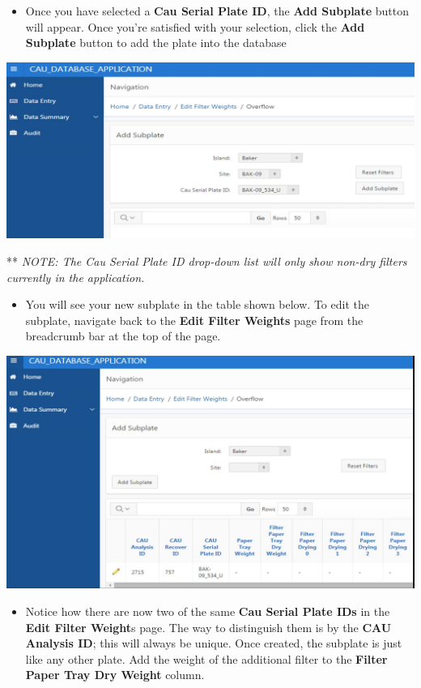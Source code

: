 \documentclass[
]{book}
\providecommand{\tightlist}{%
  \setlength{\itemsep}{0pt}\setlength{\parskip}{0pt}}
\begin{document}
\begin{itemize}
\tightlist
\item
  Once you have selected a \textbf{Cau Serial Plate ID}, the \textbf{Add Subplate} button will appear. Once you're satisfied with your selection, click the \textbf{Add Subplate} button to add the plate into the database
\end{itemize}

\includegraphics{images/Data19.jpg}

** \emph{NOTE: The Cau Serial Plate ID drop-down list will only show non-dry filters currently in the application.}

\begin{itemize}
\tightlist
\item
  You will see your new subplate in the table shown below. To edit the subplate, navigate back to the \textbf{Edit Filter Weights} page from the breadcrumb bar at the top of the page.
\end{itemize}

\includegraphics{images/Data20.jpg}

\begin{itemize}
\tightlist
\item
  Notice how there are now two of the same \textbf{Cau Serial Plate IDs} in the \textbf{Edit Filter Weight}s page. The way to distinguish them is by the \textbf{CAU Analysis ID}; this will always be unique. Once created, the subplate is just like any other plate. Add the weight of the additional filter to the \textbf{Filter Paper Tray Dry Weight} column.
\end{itemize}
\end{document}
